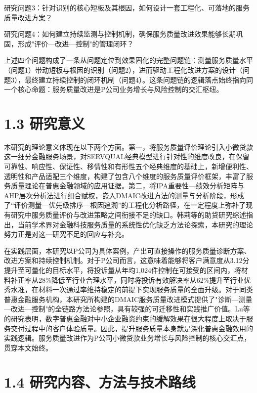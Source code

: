 研究问题3：针对识别的核心短板及其根因，如何设计一套工程化、可落地的服务质量改进方案？\par

研究问题4：如何建立持续监测与控制机制，确保服务质量改进效果能够长期巩固，形成"评价—改进—控制"的管理闭环？\par

上述四个问题构成了一条从问题定位到效果固化的完整问题链：测量服务质量水平（问题1）带动短板与根因的识别（问题2），进而驱动工程化改进方案的设计（问题3），最终建立持续控制的闭环机制（问题4）。这条问题链的逻辑落点始终指向同一个核心命题：服务质量改进是P公司业务增长与风险控制的交汇枢纽。\par

\section{1.3 研究意义}

本研究的理论意义体现在以下两个方面。第一，将服务质量评价理论引入小微贷款这一细分金融服务场景，对SERVQUAL经典模型进行针对性的维度改良，在保留可靠性、响应性、保证性、移情性和有形性五个经典维度的基础上，新增便利性、透明性和产品适配三个维度，构建了包含八个维度的服务质量评价框架，丰富了服务质量理论在普惠金融领域的应用证据。第二，将IPA重要性—绩效分析矩阵与AHP层次分析法进行组合赋权，嵌入DMAIC改进方法的测量与分析阶段，形成了“评价测量—优先级排序—根因追溯”的工程化分析路径，在一定程度上弥补了现有研究中服务质量评价与改进策略之间衔接不足的缺口\cite{ref12}。韩莉等的助贷研究综述指出，当前学术界对金融科技服务质量的系统性优化缺乏方法论探索\cite{ref9}，本研究的理论努力正是对这一研究不足的回应与补充。\par

在实践层面，本研究以P公司为具体案例，产出可直接操作的服务质量诊断方案、改进方案和持续控制机制。对于P公司而言，这意味着能够将客户满意度从3.12分提升至可量化的目标水平，将投诉量从年均1,024件控制在可接受的区间内，将材料补正率从28\%降低至行业合理水平，同时将投诉有效解决率从62\%提升至行业优秀水准，在材料一次通过率维持稳定的前提下实现服务质量的全面升级。对于同类普惠金融服务机构，本研究所构建的DMAIC服务质量改进模式提供了"诊断—测量—改进—控制"的全链路方法论参照，具有较强的可迁移性和实践推广价值。Lu等的研究表明，数字普惠金融对中小企业融资约束的缓解效果在很大程度上取决于服务交付过程中的客户体验质量\cite{ref13}。因此，提升服务质量本身就是深化普惠金融效用的实践逻辑。服务质量改进作为P公司小微贷款业务增长与风险控制的核心交汇点，贯穿本文始终。\par

\section{1.4 研究内容、方法与技术路线}

